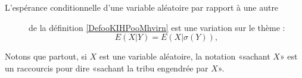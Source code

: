 \begin{description}
\item[L'espérance conditionnelle d'une variable aléatoire par rapport à une autre] de la définition \ref{DefooKIHPooMhvirn} est une variation sur le thème :
\begin{equation}
    E(X|Y)=E(X|\sigma(Y)),
\end{equation}


\end{description}

Notons que partout, si \( X\) est une variable aléatoire, la notation «sachant \( X\)» est un raccourcis pour dire «sachant la tribu engendrée par \( X\)».


\immediate\closeout\themetoc

